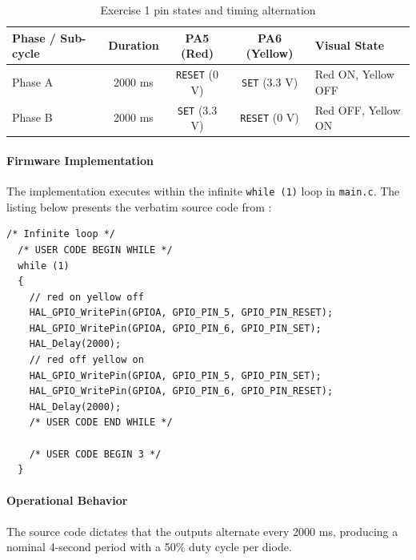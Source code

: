 \documentclass[oneside,final]{hcmut-report}
\begin{document}
\begin{table}[H]
  \centering
  \footnotesize
  \renewcommand{\arraystretch}{0.92}
  \begin{tabularx}{\linewidth}{l c c c X}
    \toprule
    \textbf{Phase / Sub-cycle} & \textbf{Duration} & \textbf{PA5 (Red)} & \textbf{PA6 (Yellow)} & \textbf{Visual State} \\
    \midrule
    Phase A & 2000 ms & \texttt{RESET} (0 V) & \texttt{SET} (3.3 V) & Red ON, Yellow OFF \\
    Phase B & 2000 ms & \texttt{SET} (3.3 V) & \texttt{RESET} (0 V) & Red OFF, Yellow ON \\
    \bottomrule
  \end{tabularx}
  \caption{Exercise 1 pin states and timing alternation}
  \label{tab:ex1_timing}
\end{table}

\paragraph{Firmware Implementation}
The implementation executes within the infinite \texttt{while (1)} loop in \texttt{main.c}. The listing below presents the verbatim source code from :

\begin{lstlisting}[caption={[Infinite loop for Exercise 1]{Infinite loop implementation for Exercise 1 (Lab1\_e1/Core/Src/main.c)}},label={lst:ex1_code},basicstyle=\fontsize{7.5pt}{8.8pt}\ttfamily,lineskip=0pt,aboveskip=1.5pt,belowskip=1.5pt]
  /* Infinite loop */
  /* USER CODE BEGIN WHILE */
  while (1)
  {
	// red on yellow off
	HAL_GPIO_WritePin(GPIOA, GPIO_PIN_5, GPIO_PIN_RESET);
	HAL_GPIO_WritePin(GPIOA, GPIO_PIN_6, GPIO_PIN_SET);
	HAL_Delay(2000);
	// red off yellow on
	HAL_GPIO_WritePin(GPIOA, GPIO_PIN_5, GPIO_PIN_SET);
	HAL_GPIO_WritePin(GPIOA, GPIO_PIN_6, GPIO_PIN_RESET);
	HAL_Delay(2000);
    /* USER CODE END WHILE */

    /* USER CODE BEGIN 3 */
  }
\end{lstlisting}

\paragraph{Operational Behavior}
The source code dictates that the outputs alternate every 2000 ms, producing a nominal 4-second period with a 50\% duty cycle per diode.
\end{document}
